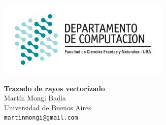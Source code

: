 \hfill \includegraphics[scale=0.5]{logo1.jpg}~\\[0.25cm]

\begin{center}
	\textbf{\Large Trazado de rayos vectorizado}\\[1cm]
	{\large Martín Mongi Badía\\[0.15cm]}
	Universidad de Buenos Aires\\[0.15cm]
	\texttt{martinmongi@gmail.com}\\[1cm]
\end{center}
